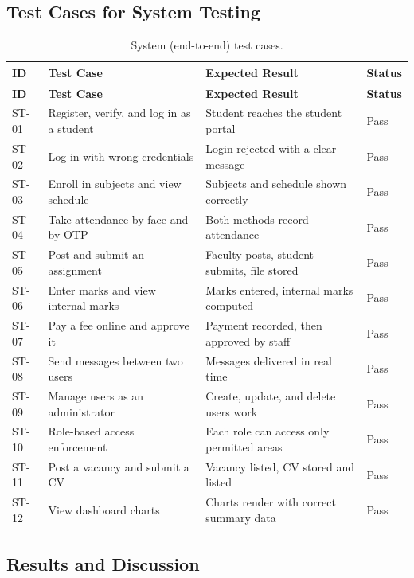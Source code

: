 \documentclass[12pt,a4paper]{report}
\begin{document}
\subsection{Test Cases for System Testing}

\begin{longtable}{|p{1.2cm}|p{4.8cm}|p{5.6cm}|p{1.6cm}|}
\caption{System (end-to-end) test cases.}
\label{tab:systest}\\
\hline
\textbf{ID} & \textbf{Test Case} & \textbf{Expected Result} & \textbf{Status} \\
\hline
\endfirsthead
\hline
\textbf{ID} & \textbf{Test Case} & \textbf{Expected Result} & \textbf{Status} \\
\hline
\endhead
ST-01 & Register, verify, and log in as a student & Student reaches the student portal & Pass \\
\hline
ST-02 & Log in with wrong credentials & Login rejected with a clear message & Pass \\
\hline
ST-03 & Enroll in subjects and view schedule & Subjects and schedule shown correctly & Pass \\
\hline
ST-04 & Take attendance by face and by OTP & Both methods record attendance & Pass \\
\hline
ST-05 & Post and submit an assignment & Faculty posts, student submits, file stored & Pass \\
\hline
ST-06 & Enter marks and view internal marks & Marks entered, internal marks computed & Pass \\
\hline
ST-07 & Pay a fee online and approve it & Payment recorded, then approved by staff & Pass \\
\hline
ST-08 & Send messages between two users & Messages delivered in real time & Pass \\
\hline
ST-09 & Manage users as an administrator & Create, update, and delete users work & Pass \\
\hline
ST-10 & Role-based access enforcement & Each role can access only permitted areas & Pass \\
\hline
ST-11 & Post a vacancy and submit a CV & Vacancy listed, CV stored and listed & Pass \\
\hline
ST-12 & View dashboard charts & Charts render with correct summary data & Pass \\
\hline
\end{longtable}

\subsection{Results and Discussion}
\end{document}
